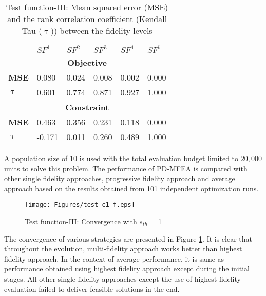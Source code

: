 \begin{table}[!htb]\footnotesize
	\centering
	\caption{Test function-III: Mean squared error (MSE) and the rank correlation coefficient (Kendall Tau ($\uptau$)) between the fidelity levels}
	\label{table:mse_tau_test_c1}
	\begin{tabular}{|l|l|l|l|l|l|}
		\noalign{\smallskip}\hline
		& \textbf{$SF^1$} & \textbf{$SF^2$} & \textbf{$SF^3$} & \textbf{$SF^4$} & \textbf{$SF^5$} \\ \hline
		\multicolumn{6}{|c|}{\textbf{Objective}}                                                                  \\ \hline
		\textbf{MSE}    & 0.080           & 0.024           & 0.008           & 0.002           & 0.000           \\ \hline
		\textbf{$\uptau$} & 0.601           & 0.774           & 0.871           & 0.927           & 1.000           \\ \hline
		\multicolumn{6}{|c|}{\textbf{Constraint}}                                                                 \\ \hline
		\textbf{MSE}    & 0.463           & 0.356           & 0.231           & 0.118           & 0.000           \\ \hline
		\textbf{$\uptau$} & -0.171          & 0.011           & 0.260           & 0.489           & 1.000           \\ \hline
	\end{tabular}
\end{table}


A population size of $10$ is used with the total evaluation budget limited to $20,000$ units to solve this problem. The performance of PD-MFEA is compared with other single fidelity approaches, progressive fidelity approach and average approach based on the results obtained from 101 independent optimization runs. 

\begin{figure}[ht]
	\centering
	\texttt{[image: Figures/test\_c1\_f.eps]}
	\caption{Test function-III: Convergence with $s_{th}$ = 1}
	\label{fig:Meanplot_test_c1_1sigma}
\end{figure}

The convergence of various strategies are presented in Figure \ref{fig:Meanplot_test_c1_1sigma}. It is clear that throughout the evolution, multi-fidelity approach works better than highest fidelity approach. In the context of average performance, it is same as performance obtained using highest fidelity approach except during the initial stages. All other single fidelity approaches except the use of highest fidelity evaluation failed to deliver feasible solutions in the end. 


